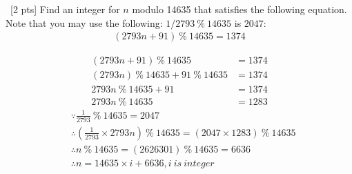\documentclass[12pt]{article}
\newenvironment{sol}[1][Solution]{\begin{trivlist}\item[\hskip\labelsep {\bfseries #1:}]}{\end{trivlist}}
\begin{document}
\begin{enumerate}
    \item \ [2 pts] Find an integer for $n$ modulo 14635 that satisfies the following equation. Note that you may use the following: $1/2793 \ \% \ 14635$ is $2047$:
    \begin{align*}
        (2793n + 91) \ \% \ 14635 = 1374
    \end{align*}
    \begin{sol}
        \begin{align*}
         (2793n + 91) \ \%  \ 14635 & = 1374 \\  
         (2793n) \ \% \ 14635 + 91 \ \% \ 14635 & = 1374 \\
         2793n \ \%  \ 14635 + 91 &= 1374 \\ 
         2793n \ \% \ 14635 &= 1283 
        \end{align*}
    \begin{align*}
        &\because \frac{1}{2793} \ \% \ 14635 = 2047\\
        &\therefore (\frac{1}{2793} \times 2793n) \ \% \ 14635 = (2047 \times 1283) \ \% \ 14635  \\
        &\therefore n \ \% \ 14635 = (2626301)  \ \% \ 14635 = 6636 \\
        &\therefore n = 14635 \times i + 6636, i \ is \ integer \\
    \end{align*}
    \end{sol}
 \end{enumerate}
\end{document}
